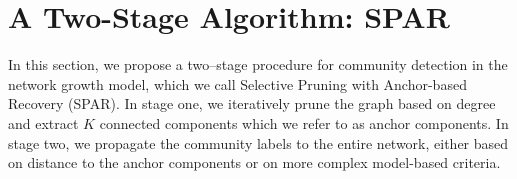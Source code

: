 \documentclass[twoside,11pt]{article}
\newtheorem{thy}[theorem]{Theorem}
\theoremstyle{remark}
\begin{document}


\section{A Two-Stage Algorithm: SPAR}
\label{sec: algorithm}

In this section, we propose a two–stage procedure for community detection in the network growth model, which we call Selective Pruning with Anchor-based Recovery (SPAR). In stage one, we iteratively prune the graph based on degree and extract $K$ connected components which we refer to as anchor components. In stage two, we propagate the community labels to the entire network, either based on distance to the anchor components or on more complex model-based criteria. 
\end{document}

